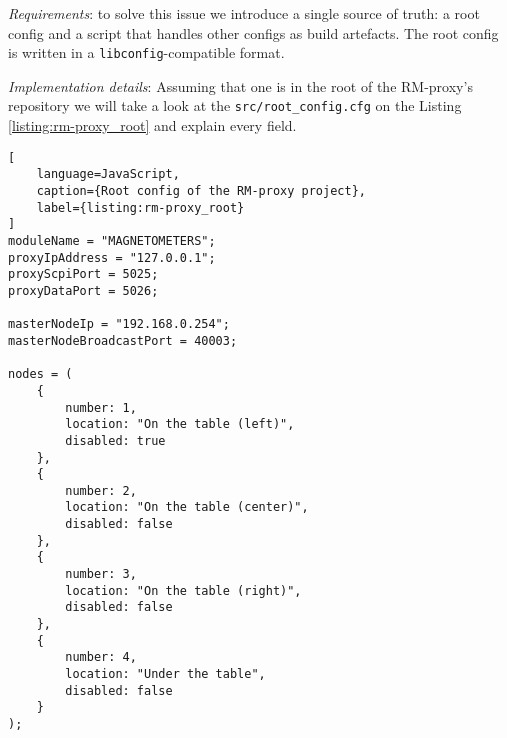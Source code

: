 \textit{Requirements}: to solve this issue we introduce a single source of truth: a root config and a script that handles other configs as build artefacts. The root config is written in a \texttt{libconfig}-compatible format. 

\textit{Implementation details}: Assuming that one is in the root of the RM-proxy's repository we will take a look at the \texttt{src/root\_config.cfg} on the Listing \ref{listing:rm-proxy_root} and explain every field.

\begin{lstlisting}[
	language=JavaScript,
	caption={Root config of the RM-proxy project},
	label={listing:rm-proxy_root}
]
moduleName = "MAGNETOMETERS";
proxyIpAddress = "127.0.0.1";
proxyScpiPort = 5025;
proxyDataPort = 5026;

masterNodeIp = "192.168.0.254";
masterNodeBroadcastPort = 40003;

nodes = (
    {
        number: 1,
        location: "On the table (left)",
        disabled: true
    },
    {
        number: 2,
        location: "On the table (center)",
        disabled: false
    },
    {
        number: 3,
        location: "On the table (right)",
        disabled: false
    },
    {
        number: 4,
        location: "Under the table",
        disabled: false
    }
);
\end{lstlisting}

